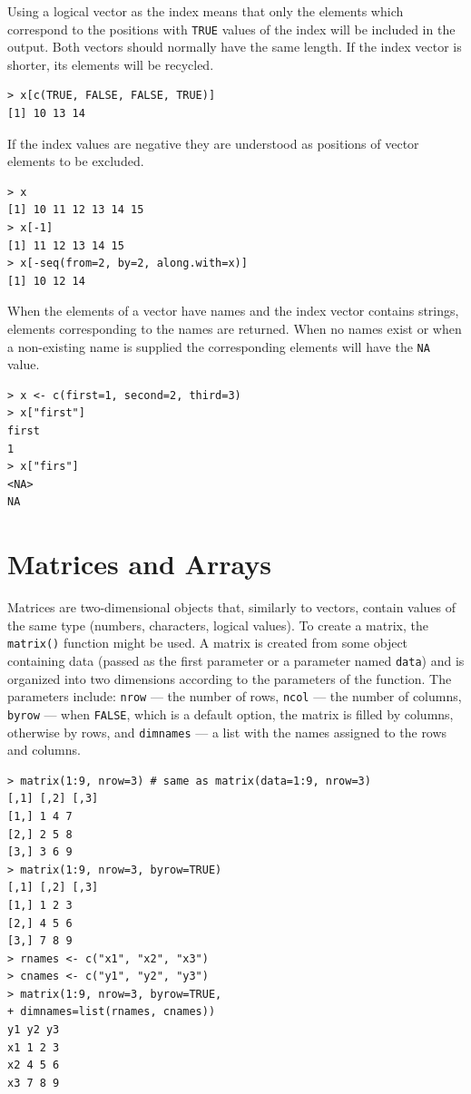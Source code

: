 Using a logical vector as the index means that only the elements which correspond to the positions with \texttt{TRUE} values of the index will be included in the
output. Both vectors should normally have the same length. If the index vector is
shorter, its elements will be recycled.

\begin{verbatim}
> x[c(TRUE, FALSE, FALSE, TRUE)]
[1] 10 13 14
\end{verbatim}

If the index values are negative they are understood as positions of vector
elements to be excluded.

\begin{verbatim}
> x
[1] 10 11 12 13 14 15
> x[-1]
[1] 11 12 13 14 15
> x[-seq(from=2, by=2, along.with=x)]
[1] 10 12 14
\end{verbatim}

When the elements of a vector have names and the index vector contains
strings, elements corresponding to the names are returned. When no names exist
or when a non-existing name is supplied the corresponding elements will have
the \texttt{NA} value.

\begin{verbatim}
> x <- c(first=1, second=2, third=3)
> x["first"]
first
1
> x["firs"]
<NA>
NA
\end{verbatim}

\section{Matrices and Arrays}

Matrices are two-dimensional objects that, similarly to vectors, contain values
of the same type (numbers, characters, logical values). To create a matrix, the
\texttt{matrix()} function might be used. A matrix is created from some object 
containing data (passed as the first parameter or a parameter named 
\texttt{data}) and is organized into two dimensions according to the parameters 
of the function. The parameters include: \texttt{nrow} --- the number of rows, 
\texttt{ncol} --- the number of columns, \texttt{byrow} --- when \texttt{FALSE}, 
which is a default option, the matrix is filled by columns, otherwise by rows, 
and \texttt{dimnames} --- a list with the names assigned to the rows and columns.

\begin{verbatim}
> matrix(1:9, nrow=3) # same as matrix(data=1:9, nrow=3)
[,1] [,2] [,3]
[1,] 1 4 7
[2,] 2 5 8
[3,] 3 6 9
> matrix(1:9, nrow=3, byrow=TRUE)
[,1] [,2] [,3]
[1,] 1 2 3
[2,] 4 5 6
[3,] 7 8 9
> rnames <- c("x1", "x2", "x3")
> cnames <- c("y1", "y2", "y3")
> matrix(1:9, nrow=3, byrow=TRUE,
+ dimnames=list(rnames, cnames))
y1 y2 y3
x1 1 2 3
x2 4 5 6
x3 7 8 9
\end{verbatim}

